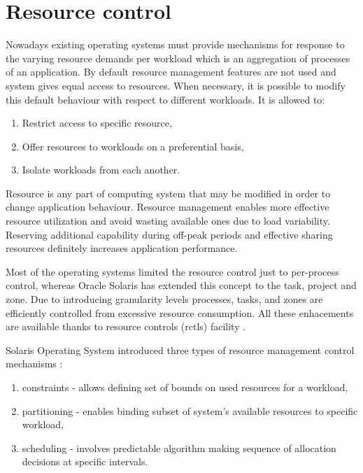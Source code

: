 \documentclass[11pt]{book}
\begin{document}
    \section{Resource control}
    \label{sec:sol:res}

      Nowadays existing operating systems must provide mechanisms for response to the varying resource demands per
      workload which is an aggregation of processes of an application. By default resource management features are not
      used and system gives equal access to resources. When necessary, it is possible to modify this default behaviour
      with respect to different workloads. It is allowed to:

      \begin{enumerate}
        \item Restrict access to specific resource,
        \item Offer resources to workloads on a preferential basis,
        \item Isolate workloads from each another.
      \end{enumerate}
	
      Resource is any part of computing system that may be modified in order to change application behaviour. Resource
      management enables more effective resource utilization and avoid wasting available ones due to load variability.
      Reserving additional capability during off-peak periods and effective sharing resources definitely increases
      application performance.

      Most of the operating systems limited the resource control just to per-process control, whereas Oracle Solaris has
      extended this concept to the task, project and zone. Due to introducing granularity levels processes, tasks, and 
      zones are efficiently controlled from excessive resource consumption. All these enhacements are available thanks 
      to resource controls (rctls) facility \cite{oracle_admin_guide}.
      
      Solaris Operating System introduced three types of resource management control mechanisms \cite{oracle_admin_guide}:

      \begin{enumerate}
        \item constraints - allows defining set of bounds on used resources for a workload,
        \item partitioning - enables binding subset of system's available resources to specific workload,
        \item scheduling - involves predictable algorithm making sequence of allocation decisions at specific intervals.
      \end{enumerate}
\end{document}
